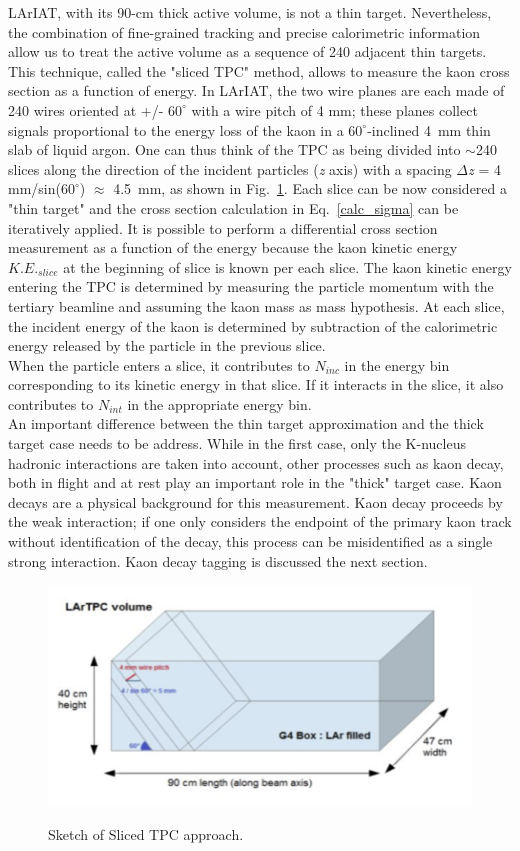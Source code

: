 LArIAT, with its 90-cm thick active volume, is not a thin target. Nevertheless, the combination of fine-grained tracking and precise calorimetric information allow us to treat the active volume as a sequence of 240 adjacent thin targets. This technique, called the "sliced TPC" method, allows to measure the kaon cross section as a function of energy.  In LArIAT, the two wire planes are each made of 240 wires oriented at +/- $60^{\circ}$ with a wire pitch of 4 mm; these planes collect signals proportional to the energy loss of the kaon in a $60^{\circ}$-inclined 4~mm thin slab of liquid argon. One can thus think of the TPC as being divided into $\sim$240 slices along the direction of the incident particles ({\emph{z}} axis) with a spacing $\Delta${\emph{z}} = 4 mm/sin($60^{\circ}$) $\approx$ 4.5~mm, as shown in Fig.~\ref{fig:slicedtpc}. Each slice can be now considered a "thin target" and the cross section calculation in Eq.~\ref{calc_sigma} can be iteratively applied. It is possible to perform a differential cross section measurement as a function of the energy because the kaon kinetic energy $K.E._{slice}$  at the beginning of slice is known per each slice. The kaon kinetic energy entering the TPC is determined by measuring the particle momentum with the tertiary beamline and assuming the kaon mass as mass hypothesis. At each slice, the incident energy of the kaon is determined by subtraction of the calorimetric energy released by the particle in the previous slice.\\ 
When the particle enters a slice, it contributes to $N_{inc}$ in the energy bin corresponding to its kinetic energy in that slice. If it interacts in the slice, it also contributes to $N_{int}$ in the appropriate energy bin.\\

An important difference between the thin target approximation and the thick target case needs to be address. While in the first case, only the K-nucleus hadronic interactions are taken into account, other processes such as kaon decay, both in flight and at rest play an important role in the "thick" target case. Kaon decays are a physical background for this measurement. Kaon decay proceeds by the weak interaction; if one only considers the endpoint of the primary kaon track without identification of the decay, this process can be misidentified as a single strong interaction. Kaon decay tagging is discussed the next section. 


\begin{figure}[htpb]
\centering
\includegraphics[scale=1.25]{images/Lariat/SlicedTPC.png}\\
\caption{Sketch of Sliced TPC approach.}
\label{fig:slicedtpc}
\end{figure}

